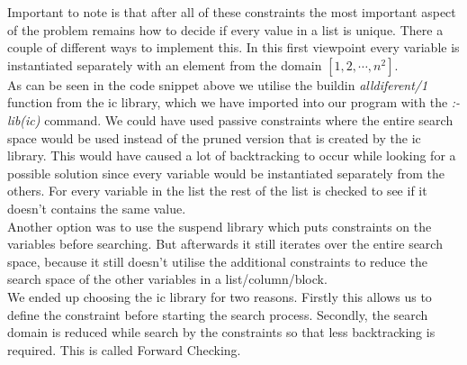 Important to note is that after all of these constraints the most important aspect of the problem remains how to decide if every value in a list is unique. 
There a couple of different ways to implement this.
In this first viewpoint every variable is instantiated separately with an element from the domain $[1,2,\cdots,n^{2}]$. \\

As can be seen in the code snippet above we utilise the buildin \textsl{alldiferent/1} function from the ic library, which we have imported into our program with the \textsl{:- lib(ic)} command.
We could have used passive constraints where the entire search space would be used instead of the pruned version that is created by the ic library.
This would have caused a lot of backtracking to occur while looking for a possible solution since every variable would be instantiated separately from the others.
For every variable in the list the rest of the list is checked to see if it doesn't contains the same value.\\

Another option was to use the suspend library which puts constraints on the variables before searching.
But afterwards it still iterates over the entire search space, because it still doesn't utilise the additional constraints to reduce the search space of the other variables in a list/column/block.\\

We ended up choosing the ic library for two reasons.
Firstly this allows us to define the constraint before starting the search process.
Secondly, the search domain is reduced while search by the constraints so that less backtracking is required.
This is called Forward Checking. \\

